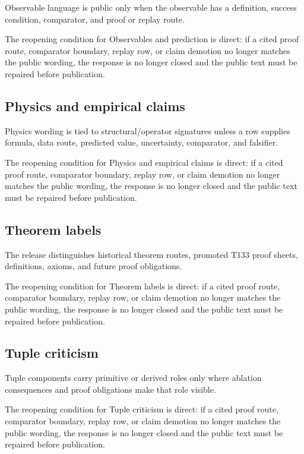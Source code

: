 Observable language is public only when the observable has a definition, success condition, comparator, and proof or replay route.


The reopening condition for Observables and prediction is direct: if a cited proof route, comparator boundary, replay row, or claim demotion no longer matches the public wording, the response is no longer closed and the public text must be repaired before publication.


\subsection{Physics and empirical claims}

Physics wording is tied to structural/operator signatures unless a row supplies formula, data route, predicted value, uncertainty, comparator, and falsifier.


The reopening condition for Physics and empirical claims is direct: if a cited proof route, comparator boundary, replay row, or claim demotion no longer matches the public wording, the response is no longer closed and the public text must be repaired before publication.


\subsection{Theorem labels}

The release distinguishes historical theorem routes, promoted T133 proof sheets, definitions, axioms, and future proof obligations.


The reopening condition for Theorem labels is direct: if a cited proof route, comparator boundary, replay row, or claim demotion no longer matches the public wording, the response is no longer closed and the public text must be repaired before publication.


\subsection{Tuple criticism}

Tuple components carry primitive or derived roles only where ablation consequences and proof obligations make that role visible.


The reopening condition for Tuple criticism is direct: if a cited proof route, comparator boundary, replay row, or claim demotion no longer matches the public wording, the response is no longer closed and the public text must be repaired before publication.
